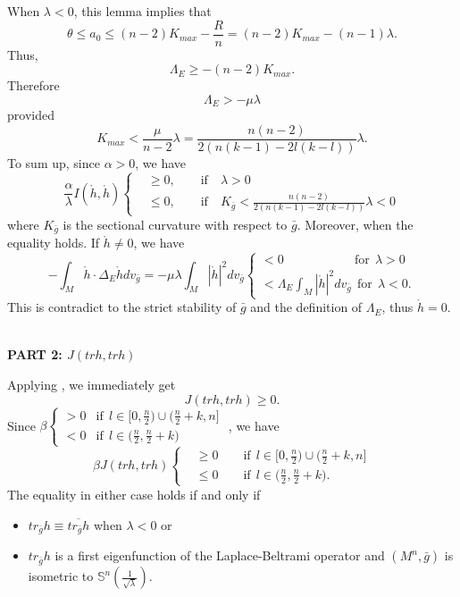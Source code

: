 \documentclass[12pt]{amsart}
\newcommand{\bg}{\bar{g}}
\numberwithin{equation}{section}
\begin{document}
When $\lambda<0$, this lemma implies that $$\theta\leq a_0\leq(n-2)K_{max}-\frac{R}{n}=(n-2)K_{max}-(n-1)\lambda.$$ Thus,
\begin{equation*}
    \Lambda_E\geq-(n-2)K_{max}.
\end{equation*} 
Therefore $$\Lambda_E>-\mu \lambda$$ provided $$K_{max}<\frac{\mu}{n-2}\lambda=\frac{n(n-2)}{2\left(n(k-1)-2l(k-l)\right)}\lambda.$$ To sum up, since $\alpha>0$, we have
\begin{equation}\label{eq: part1}
    \frac{\alpha}{\lambda} I(\mathring{h},\mathring{h})
    \begin{cases}
        &\geq 0, \qquad \mathrm{if} \quad \lambda>0\\
        &\leq 0, \qquad \mathrm{if} \quad K_{\bg} < \frac{n(n-2)}{2\left(n(k-1)-2l(k-l)\right)}\lambda<0
    \end{cases}
\end{equation}
where $K_{\bg}$ is the sectional curvature with respect to $\bg$. Moreover, when the equality holds. If $\mathring{h}\neq0$, we have
\begin{equation*}
    -\int_M\mathring{h}\cdot\Delta_E\mathring{h}dv_{\bg}=-\mu\lambda\int_M|\mathring{h}|^2dv_{\bg}\begin{cases}
        <0\qquad \qquad \ \  \ \quad  \mathrm{for}\ \ \lambda>0\\
        <\Lambda_E\int_M|\mathring{h}|^2dv_{\bg}\ \ \mathrm{for}\ \ \lambda<0.
    \end{cases}
\end{equation*}
This is contradict to the strict stability of $\bg$ and the definition of $\Lambda_E$, thus $\mathring{h}=0$.

~\\
\textbf{PART 2: $J(trh,trh)$}

Applying , we immediately get 
\begin{equation*}
    J(trh,trh) \geq 0.
\end{equation*}
Since $\beta\begin{cases} >0 & \mathrm{if}\ \ l\in\big[0,\frac{n}{2}\big)\cup\big(\frac{n}{2}+k,n\big] \\ <0 & \mathrm{if}\ \ l\in\big(\frac{n}{2},\frac{n}{2}+k\big) \end{cases}$
, we have
\begin{equation}\label{eq: part2}
    \beta J(trh,trh)
    \begin{cases}
        &\geq 0 \qquad \mathrm{if} \ \ l\in\big[0,\frac{n}{2}\big)\cup\big(\frac{n}{2}+k,n\big]\\
        &\leq 0 \qquad \mathrm{if} \ \ l\in\big(\frac{n}{2},\frac{n}{2}+k\big).
    \end{cases}
\end{equation}
The equality in either case holds if and only if 
\begin{itemize}
    \item $tr_{\bg} h \equiv \overline{tr_{\bg}h}$ when $\lambda<0$ or
    \item $tr_{\bg}h$ is a first eigenfunction of the Laplace-Beltrami operator and $(M^n,\bg)$ is isometric to $\mathbb{S}^n \left(\frac{1}{\sqrt{\lambda}}\right)$.
\end{itemize}
\end{document}
